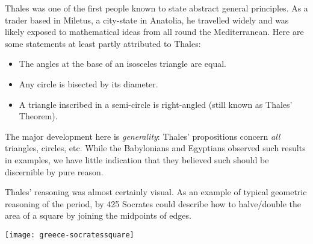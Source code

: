 
Thales was one of the first people known to state abstract general principles. As a trader based in Miletus, a city-state in Anatolia, he travelled widely and was likely exposed to mathematical ideas from all round the Mediterranean. Here are some statements at least partly attributed to Thales:\vspace{-3pt}
\begin{itemize}\itemsep0pt
  \item The angles at the base of an isosceles triangle are equal.
  \item Any circle is bisected by its diameter.
  \item A triangle inscribed in a semi-circle is right-angled (still known as Thales' Theorem).
\end{itemize}
\begin{minipage}[t]{0.79\linewidth}\vspace{-10pt}
The major development here is \emph{generality}: Thales' propositions concern \emph{all} triangles, circles, etc. While the Babylonians and Egyptians observed such results in examples, we have little indication that they believed such should be discernible by pure reason.\par
Thales' reasoning was almost certainly visual. As an example of typical geometric reasoning of the period, by 425\BC{} Socrates could describe how to halve/double the area of a square by joining the midpoints of edges.
  \end{minipage}\hfill\begin{minipage}[t]{0.2\linewidth}\vspace{-8pt}
  \flushright\texttt{[image: greece-socratessquare]}
  \end{minipage}\vspace{-5pt}




